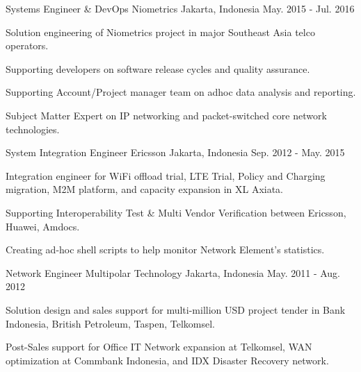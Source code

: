 \begin{cventries}
  \cventry
    {Systems Engineer \& DevOps} %
    {Niometrics} %
    {Jakarta, Indonesia} %
    {May. 2015 - Jul. 2016} %
    {
      \begin{cvitems} %
        \item {Solution engineering of Niometrics project in major Southeast Asia telco operators.}
        \item {Supporting developers on software release cycles and quality assurance.}
        \item {Supporting Account/Project manager team on adhoc data analysis and reporting.}
        \item {Subject Matter Expert on IP networking and packet-switched core network technologies.}
      \end{cvitems}
    }

  \cventry
    {System Integration Engineer} %
    {Ericsson} %
    {Jakarta, Indonesia} %
    {Sep. 2012 - May. 2015} %
    {
      \begin{cvitems} %
        \item {Integration engineer for WiFi offload trial, LTE Trial, Policy and Charging migration, M2M platform, and capacity expansion in XL Axiata.}
        \item {Supporting Interoperability Test \& Multi Vendor Verification between Ericsson, Huawei, Amdocs.}
        \item {Creating ad-hoc shell scripts to help monitor Network Element's statistics.}
      \end{cvitems}
    }

  \cventry
    {Network Engineer} %
    {Multipolar Technology} %
    {Jakarta, Indonesia} %
    {May. 2011 - Aug. 2012} %
    {
      \begin{cvitems} %
        \item {Solution design and sales support for multi-million USD project tender in Bank Indonesia, British Petroleum, Taspen, Telkomsel.}
        \item {Post-Sales support for Office IT Network expansion at Telkomsel, WAN optimization at Commbank Indonesia, and IDX Disaster Recovery network.}
      \end{cvitems}
    }

\end{cventries}
